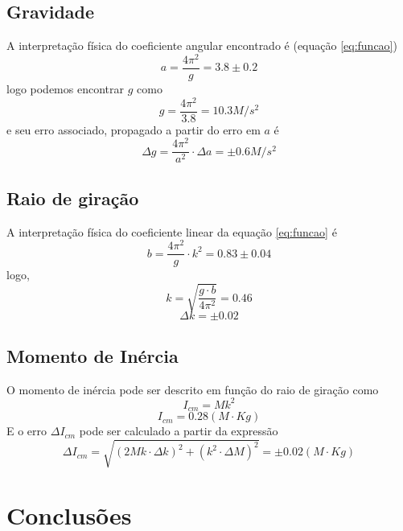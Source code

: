 \documentclass[12pt,a4paper]{article}
\begin{document}
\subsection{Gravidade}
A interpretação física do coeficiente angular encontrado é (equação \ref{eq:funcao})
 $$ a = \frac{4\pi^2}{g} = 3.8 \pm 0.2$$
  logo podemos encontrar $g$ como 
  $$ g = \frac{4\pi^2}{3.8} = 10.3 M/s^2 $$ 
  e seu erro associado, propagado a partir do erro em $a$ é
  $$ \Delta g = \frac{4\pi^2}{a^2} \cdot \Delta a = \pm 0.6 M/s^2 $$
  
\subsection{Raio de giração}

A interpretação física do coeficiente linear da equação \ref{eq:funcao} é 
$$ b = \frac{4\pi^2}{g} \cdot k^2 = 0.83 \pm 0.04 $$
logo, 
$$ k = \sqrt{\frac{g \cdot b}{4\pi^2}} = 0.46 $$
$$ \Delta k = \pm 0.02 $$

\subsection{Momento de Inércia}
O momento de inércia pode ser descrito em função do raio de giração como 
$$ I_{cm}  = Mk^2 $$
$$ I_{cm}  = 0.28 (M \cdot Kg)$$
E o erro $ \Delta I_{cm}$ pode ser calculado a partir da expressão 
$$\Delta I_{cm}  =\sqrt{(2Mk \cdot \Delta k)^2 + (k^2 \cdot \Delta M)^2} = \pm 0.02 (M \cdot Kg) $$

\section{Conclusões}
\end{document}
